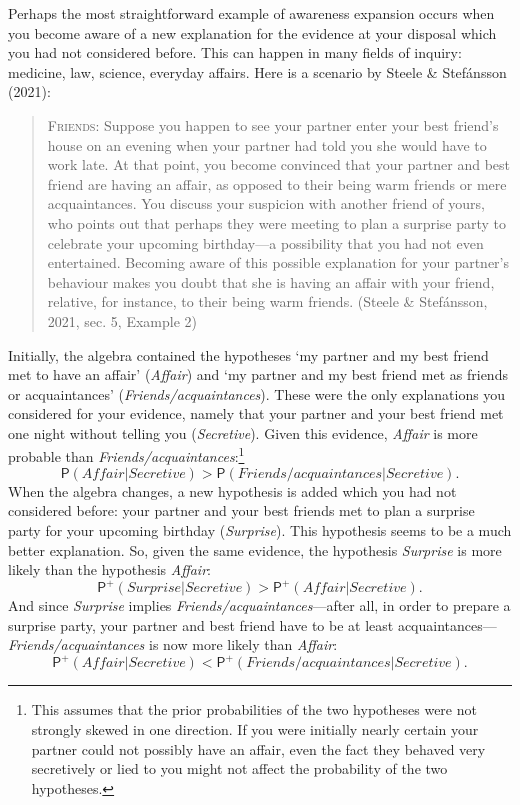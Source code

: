 \documentclass[
  11pt,
  dvipsnames,enabledeprecatedfontcommands]{scrartcl}
\newcommand{\pr}[1]{\ensuremath{\mathsf{P}(#1)}}
\newcommand{\ppr}[2]{\ensuremath{\mathsf{P}^{#1}(#2)}}
\begin{document}
Perhaps the most straightforward example of awareness expansion occurs
when you become aware of a new explanation for the evidence at your
disposal which you had not considered before. This can happen in many
fields of inquiry: medicine, law, science, everyday affairs. Here is a
scenario by Steele \& Stefánsson (2021):

\begin{quote}
\textsc{Friends}: Suppose you happen to see your partner enter your best
friend's house on an evening when your partner had told you she would
have to work late. At that point, you become convinced that your partner
and best friend are having an affair, as opposed to their being warm
friends or mere acquaintances. You discuss your suspicion with another
friend of yours, who points out that perhaps they were meeting to plan a
surprise party to celebrate your upcoming birthday---a possibility that
you had not even entertained. Becoming aware of this possible
explanation for your partner's behaviour makes you doubt that she is
having an affair with your friend, relative, for instance, to their
being warm friends. (Steele \& Stefánsson, 2021, sec. 5, Example 2)
\end{quote}

\doublespace

\noindent Initially, the algebra contained the hypotheses `my partner
and my best friend met to have an affair' (\textit{Affair}) and `my
partner and my best friend met as friends or acquaintances'
(\textit{Friends/acquaintances}). These were the only explanations you
considered for your evidence, namely that your partner and your best
friend met one night without telling you (\textit{Secretive}). Given
this evidence, \textit{Affair} is more probable than
\textit{Friends/acquaintances}:\footnote{This assumes that the prior
  probabilities of the two hypotheses were not strongly skewed in one
  direction. If you were initially nearly certain your partner could not
  possibly have an affair, even the fact they behaved very secretively
  or lied to you might not affect the probability of the two hypotheses.}
\[\pr{\textit{Affair} \vert  \textit{Secretive} }> \pr{\textit{Friends/acquaintances} \vert \textit{Secretive}} \tag{>}.\]
When the algebra changes, a new hypothesis is added which you had not
considered before: your partner and your best friends met to plan a
surprise party for your upcoming birthday (\textit{Surprise}). This
hypothesis seems to be a much better explanation. So, given the same
evidence, the hypothesis \textit{Surprise} is more likely than the
hypothesis \textit{Affair}:
\[\ppr{+}{ \textit{Surprise} \vert \textit{Secretive}}> \ppr{+}{ \textit{Affair} \vert \textit{Secretive}}.\]
And since \textit{Surprise} implies
\textit{Friends/acquaintances}---after all, in order to prepare a
surprise party, your partner and best friend have to be at least
acquaintances--- \textit{Friends/acquaintances} is now more likely than
\textit{Affair}:
\[\ppr{+}{\textit{Affair} \vert  \textit{Secretive} } < \ppr{+}{\textit{Friends/acquaintances} \vert \textit{Secretive}}. \tag{<}\]
\end{document}
